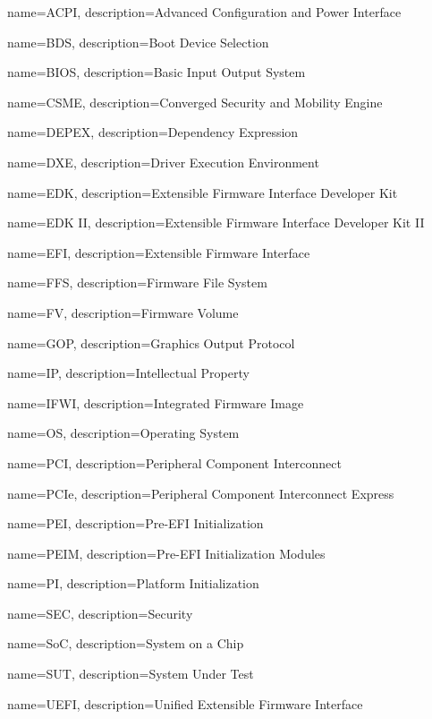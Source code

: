  {
	name=ACPI,
	description={Advanced Configuration and Power Interface
	}
}

 {
	name=BDS,
	description={Boot Device Selection
	}
}

 {
    name=BIOS,
    description={Basic Input Output System
    }
}


 {
    name=CSME,
    description={Converged Security and Mobility Engine
    }
}

 {
	name=DEPEX,
	description={Dependency Expression
	}
}


 {
	name=DXE,
	description={Driver Execution Environment
	}
}

 {
	name=EDK,
	description={Extensible Firmware Interface Developer Kit
	}
}

 {
	name=EDK II,
	description={Extensible Firmware Interface Developer Kit II
	}
}

 {
	name=EFI,
	description={Extensible Firmware Interface
	}
}

 {
    name=FFS,
    description={Firmware File System
    }
}

 {
    name=FV,
    description={Firmware Volume
    }
}

 {
    name=GOP,
    description={Graphics Output Protocol
    }
}

 {
    name=IP,
    description={Intellectual Property
    }
}

 {
    name=IFWI,
    description={Integrated Firmware Image
    }
}

 {
	name=OS,
	description={Operating System
	}
}

 {
	name=PCI,
	description={Peripheral Component Interconnect
	}
}

 {
	name=PCIe,
	description={Peripheral Component Interconnect Express
	}
}

 {
    name=PEI,
    description={Pre-EFI Initialization
    }
}

 {
    name=PEIM,
    description={Pre-EFI Initialization Modules
    }
}

 {
	name=PI,
	description={Platform Initialization
	}
}

 {
	name=SEC,
	description={Security
	}
}

 {
	name=SoC,
	description={System on a Chip
	}
}


 {
	name=SUT,
	description={System Under Test
	}
}

 {
	name=UEFI,
	description={Unified Extensible Firmware Interface
	}
}
